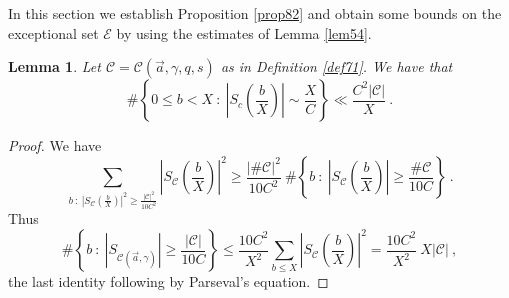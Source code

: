 \documentclass{amsart}
\newtheorem{lemma}[theorem]{Lemma}
\numberwithin{equation}{subsection}
\begin{document}
In this section we establish Proposition \ref{prop82} and obtain some bounds on the exceptional set $\mathcal{E}$ by using the estimates of Lemma \ref{lem54}.

\begin{lemma}\label{lem101}
Let $\mathcal{C}=\mathcal{C}(\vec{a},\gamma, q, s)$ as in Definition \ref{def71}. We have that
$$\#\left\{ 0\leq b< X\::\: \left|S_c\left(\frac{b}{X}\right)\right| \sim \frac{X}{C}  \right\} \ll  \frac{C^2 |\mathcal{C}|}{X}\:.$$
\end{lemma}
\begin{proof}
We have
$$\sum_{b\::\: \left|S_{\mathcal{C}}\left(\frac{b}{X}\right)\right|^2\geq \frac{|\mathcal{C}|^2}{10 C^2}}  \left|S_{\mathcal{C}}\left(\frac{b}{X}\right)\right|^2  
\geq  \frac{|\#\mathcal{C}|^2}{10 C^2}  \: \#\left\{b\::\: \left|S_{\mathcal{C}}\left(\frac{b}{X}\right)\right| \geq \frac{\#\mathcal{C}}{10 C} \right\}\:.
$$
Thus
$$\#\left\{b\::\: |S_{\mathcal{C}(\vec{a}, \gamma)}|\geq \frac{|\mathcal{C}|}{10 C}  \right\}\leq \frac{10 C^2}{X^2} \sum_{b\leq X}  \left|S_{\mathcal{C}}\left(\frac{b}{X}\right)\right|^2 =\frac{10 C^2}{X^2}\: X|\mathcal{C}|\:,$$
the last identity following by Parseval's equation.
\end{proof}
\end{document}
